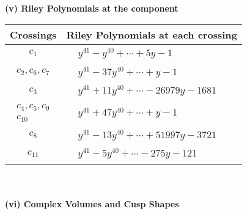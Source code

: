 \documentclass[1p]{elsarticle_modified}
\theoremstyle{definition}
\begin{document}
\newpage\renewcommand{\arraystretch}{1}
\flushleft \textbf{(v) Riley Polynomials at the component}\newline \\
\begin{tabular}{m{50pt}|m{274pt}}
Crossings & \hspace{64pt}Riley Polynomials at each crossing \\
\hline $$\begin{aligned}c_{1}\end{aligned}$$&$\begin{aligned}
&y^{41}- y^{40}+\cdots+5 y-1
\end{aligned}$\\
\hline $$\begin{aligned}c_{2},c_{6},c_{7}\end{aligned}$$&$\begin{aligned}
&y^{41}-37 y^{40}+\cdots+y-1
\end{aligned}$\\
\hline $$\begin{aligned}c_{3}\end{aligned}$$&$\begin{aligned}
&y^{41}+11 y^{40}+\cdots-26979 y-1681
\end{aligned}$\\
\hline $$\begin{aligned}c_{4},c_{5},c_{9}\\c_{10}\end{aligned}$$&$\begin{aligned}
&y^{41}+47 y^{40}+\cdots+y-1
\end{aligned}$\\
\hline $$\begin{aligned}c_{8}\end{aligned}$$&$\begin{aligned}
&y^{41}-13 y^{40}+\cdots+51997 y-3721
\end{aligned}$\\
\hline $$\begin{aligned}c_{11}\end{aligned}$$&$\begin{aligned}
&y^{41}-5 y^{40}+\cdots-275 y-121
\end{aligned}$\\
\hline
\end{tabular}\\~\\
\newpage\flushleft \textbf{(vi) Complex Volumes and Cusp Shapes}
\end{document}
